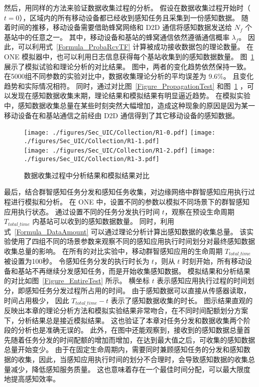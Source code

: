 然后，用同样的方法来验证数据收集过程的分析。
假设在数据收集过程开始时（$t=0$），区域内的所有移动设备都已经收到感知任务且采集到一份感知数据。
随着时间的推移，移动设备需要借助蜂窝网络和 D2D 通信将感知数据发送给 $N_f$ 个基站中的任意之一。
其中，移动设备和基站的蜂窝通信依然遵循通信概率 $\lambda_f$。
因此，可以利用式~\eqref{Formula_ProbaRcvTF} 计算被成功接收数据包的理论数量。
在 ONE 模拟器中，也可以利用日志信息获得每个基站收集到的感知数据数量。
图~\ref{Figure_CollectionTest} 展示了模拟试验和理论分析的对比结果。
图中，两者的变化趋势依然保持一致。
在5000组不同参数的实验对比中，数据收集理论分析的平均误差为 9.6\%。
且变化趋势和实际情况相符。
同时，通过对比图~\ref{Figure_PropagationTest} 和图~\ref{Figure_CollectionTest} ，可以发现在感知数据收集末期，理论结果和模拟结果有明显逼近趋势。
在模拟实验中，感知数据收集总量在某些时刻突然大幅增加，造成这种现象的原因是因为某一移动设备在和基站通信之前经由 D2D 通信得到了其它移动设备的感知数据。

\begin{figure}[!h]
  \centering
  {\texttt{[image: ./figures/Sec\_UIC/Collection/R1-0.pdf]}}
  {\texttt{[image: ./figures/Sec\_UIC/Collection/R1-1.pdf]}}\\
  {\texttt{[image: ./figures/Sec\_UIC/Collection/R1-2.pdf]}}
  {\texttt{[image: ./figures/Sec\_UIC/Collection/R1-3.pdf]}}
  \vspace{-0.5em}
  \caption{数据收集过程中分析结果和模拟结果对比}
  \vspace{-0.5em}
  \label{Figure_CollectionTest}
\end{figure}

最后，结合群智感知任务分发和感知任务收集，对边缘网络中群智感知应用执行过程进行模拟和分析。
在 ONE 中，设置不同的参数以模拟不同场景下的群智感知应用执行状态。
通过设置不同的任务分发执行时间 $t$，观察在预设生命周期 $T_{total\_time}$ 内基站可以收到的感知数据数量。
同时，利用式~\eqref{Formula_DataAmount} 可以通过理论分析计算出感知数据的收集总量。
该实验使用了四组不同的场景参数来观察不同的感知应用执行时间划分对最终感知数据收集总量的影响。
在所有的对比实验中，移动群智感知应用的生命周期 $T_{total\_time}$ 被设置为100秒。
令感知任务分发的执行时长为 $t$，则从 $t$ 时刻开始，所有移动设备和基站不再继续分发感知任务，而是开始收集感知数据。
模拟结果和分析结果的对比如图~\ref{Figure_EntireTest} 所示。
横坐标 $t$ 表示感知应用执行过程的时间划分，即感知任务分发过程所占用的时间。
由于感知数据可以直接从传感器读取，时间占用极少，
因此 $T_{total\_time} - t$  表示了感知数据收集的时长。
图示结果直观的反映出本章的理论分析方法和模拟实验结果非常吻合，在不同时间配额划分方案下，分析结果总是接近模拟结果。
这也验证了本章对任务分发和数据收集两个阶段的分析也是准确无误的。
此外，在图中还能观察到，接收到的感知数据总量首先随着任务分发的时间配额的增加而增加，在达到最大值之后，可收集的感知数据总量开始变少。
由于在固定生命周期内，需要同时兼顾感知任务的分发和感知数据的收集，因此，当感知应用执行时间的划分不合理时，会导致感知数据的收集总量减少，降低感知服务质量。
这也意味着存在一个最佳时间分配，可以最大限度地提高感知效率。

